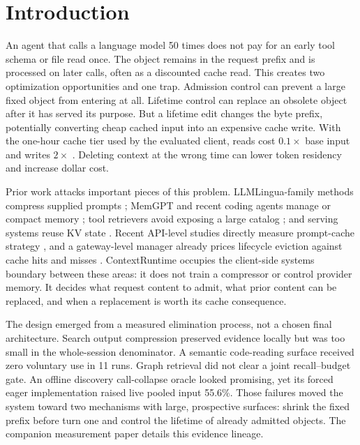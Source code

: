 \documentclass[10pt,twocolumn]{article}
\begin{document}
\section{Introduction}

An agent that calls a language model 50 times does not pay for an early tool schema or file read once.
The object remains in the request prefix and is processed on later calls, often as a discounted cache
read.  This creates two optimization opportunities and one trap.  Admission control can prevent a
large fixed object from entering at all.  Lifetime control can replace an obsolete object after it has
served its purpose.  But a lifetime edit changes the byte prefix, potentially converting cheap cached
input into an expensive cache write.  With the one-hour cache tier used by the evaluated client,
reads cost $0.1\times$ base input and writes $2\times$ \cite{anthropicPromptCaching}.  Deleting context
at the wrong time can lower token residency and increase dollar cost.

Prior work attacks important pieces of this problem.  LLMLingua-family methods compress supplied
prompts \cite{jiang2023llmlingua,jiang2024longllmlingua,pan2024llmlingua2}; MemGPT and recent coding
agents manage or compact memory \cite{packer2023memgpt,liu2026cat,verma2026focus,
zhang2026autocompact}; tool retrievers avoid exposing a large catalog
\cite{chen2024reinvoke,fei2025mcpzero}; and serving systems reuse KV state
\cite{kwon2023pagedattention,zheng2024sglang,gim2024promptcache}.  Recent API-level studies directly
measure prompt-cache strategy \cite{lumer2026cache,song2026capc,khailo2026keepalive}, and a
gateway-level manager already prices lifecycle eviction against cache hits and misses
\cite{xu2026tokenpilot}.  ContextRuntime occupies the client-side systems boundary between these areas:
it does not train a compressor or control provider memory.  It decides what request content to admit, what prior content can be
replaced, and when a replacement is worth its cache consequence.

The design emerged from a measured elimination process, not a chosen final architecture.  Search
output compression preserved evidence locally but was too small in the whole-session denominator.  A semantic code-reading
surface received zero voluntary use in 11 runs.  Graph retrieval did not clear a joint recall--budget
gate.  An offline discovery call-collapse oracle looked promising, yet its forced eager implementation
raised live pooled input 55.6\%.  Those failures moved the system toward two mechanisms with large,
prospective surfaces: shrink the fixed prefix before turn one and control the lifetime of already
admitted objects.  The companion measurement paper details this evidence lineage.
\end{document}
